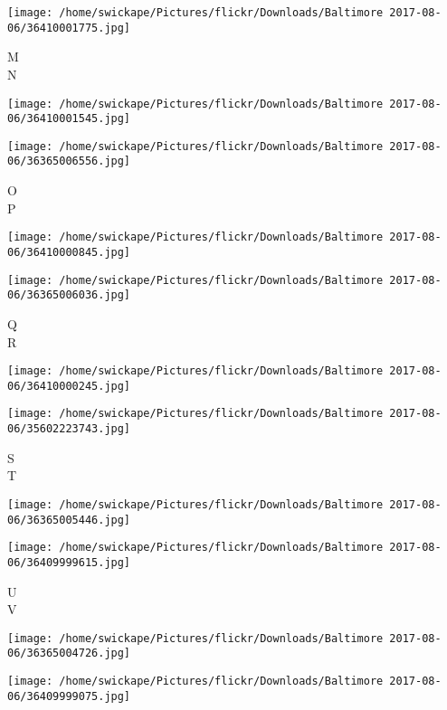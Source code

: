 \documentclass[10pt,letterpaper]{article}
\begin{document}
\vspace{0.25in}
\texttt{[image: /home/swickape/Pictures/flickr/Downloads/Baltimore 2017-08-06/36410001775.jpg]}

M\\
N\\
\pagebreak

\texttt{[image: /home/swickape/Pictures/flickr/Downloads/Baltimore 2017-08-06/36410001545.jpg]}

\vspace{0.25in}
\texttt{[image: /home/swickape/Pictures/flickr/Downloads/Baltimore 2017-08-06/36365006556.jpg]}

O\\
P\\
\pagebreak

\texttt{[image: /home/swickape/Pictures/flickr/Downloads/Baltimore 2017-08-06/36410000845.jpg]}

\vspace{0.25in}
\texttt{[image: /home/swickape/Pictures/flickr/Downloads/Baltimore 2017-08-06/36365006036.jpg]}

Q\\
R\\
\pagebreak

\texttt{[image: /home/swickape/Pictures/flickr/Downloads/Baltimore 2017-08-06/36410000245.jpg]}

\vspace{0.25in}
\texttt{[image: /home/swickape/Pictures/flickr/Downloads/Baltimore 2017-08-06/35602223743.jpg]}

S\\
T\\
\pagebreak

\texttt{[image: /home/swickape/Pictures/flickr/Downloads/Baltimore 2017-08-06/36365005446.jpg]}

\vspace{0.25in}
\texttt{[image: /home/swickape/Pictures/flickr/Downloads/Baltimore 2017-08-06/36409999615.jpg]}

U\\
V\\
\pagebreak

\texttt{[image: /home/swickape/Pictures/flickr/Downloads/Baltimore 2017-08-06/36365004726.jpg]}

\vspace{0.25in}
\texttt{[image: /home/swickape/Pictures/flickr/Downloads/Baltimore 2017-08-06/36409999075.jpg]}
\end{document}
